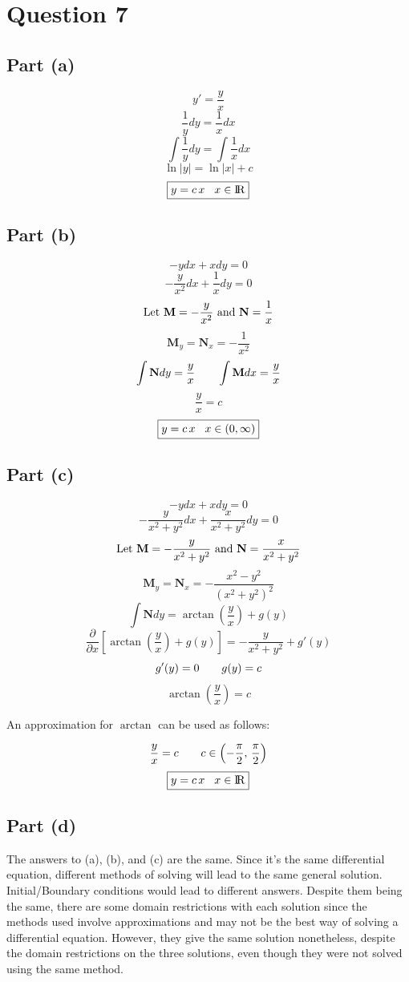 \documentclass{article}
\begin{document}
\section*{Question 7}
\subsection*{Part (a)}
\[y'=\frac{y}{x}\]
\[\frac{1}{y}dy=\frac{1}{x}dx\]
\[\int\frac{1}{y}dy=\int\frac{1}{x}dx\]
\[\ln|y|=\ln|x|+c\]
\[\boxed{y=c\,x\hspace{3 mm}x\in{\rm I\!R}}\]
\subsection*{Part (b)}
\[-ydx+xdy=0\]
\[-\frac{y}{x^2}dx+\frac{1}{x}dy=0\]
\[\textnormal{Let } \textbf{M}=-\frac{y}{x^2} \textnormal{ and } \textbf{N}=\frac{1}{x}\]
\[\textbf{M}_y=\textbf{N}_x=-\frac{1}{x^2}\]
\[\int\textbf{N}dy=\frac{y}{x}\hspace{7 mm}\int\textbf{M}dx=\frac{y}{x}\]
\[\frac{y}{x}=c\]
\[\boxed{y=c\,x\hspace{3 mm}x\in(0,\infty)}\]
\subsection*{Part (c)}
\[-ydx+xdy=0\]
\[-\frac{y}{x^2+y^2}dx+\frac{x}{x^2+y^2}dy=0\]
\[\textnormal{Let } \textbf{M}=-\frac{y}{x^2+y^2} \textnormal{ and } \textbf{N}=\frac{x}{x^2+y^2}\]
\[\textbf{M}_y=\textbf{N}_x=-\frac{x^2-y^2}{(x^2+y^2)^2}\]
\[\int\textbf{N}dy=\arctan\left(\frac{y}{x}\right)+g(y)\]
\[\frac{\partial}{\partial x}\left[\arctan\left(\frac{y}{x}\right)+g(y)\right]=-\frac{y}{x^2+y^2}+g'(y)\]
\[g'(y)=0\hspace{7 mm}g(y)=c\]
\[\arctan\left(\frac{y}{x}\right)=c\]
\begin{center}
An approximation for \(\arctan\) can be used as follows:
\end{center}
\[\frac{y}{x}=c\hspace{7 mm}c\in\left(-\frac{\pi}{2},\,\frac{\pi}{2}\right)\]
\[\boxed{y=c\,x\hspace{3 mm}x\in{\rm I\!R}}\]
\subsection*{Part (d)}
The answers to (a), (b), and (c) are the same. Since it's the same differential equation, different methods of solving will lead to the same general solution. Initial/Boundary conditions would lead to different answers. Despite them being the same, there are some domain restrictions with each solution since the methods used involve approximations and may not be the best way of solving a differential equation. However, they give the same solution nonetheless, despite the domain restrictions on the three solutions, even though they were not solved using the same method.
\end{document}
